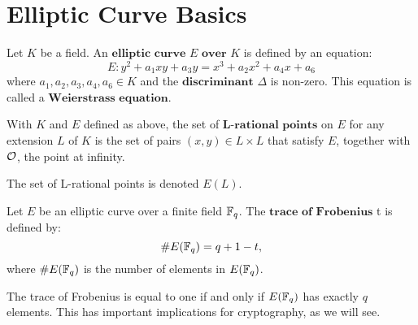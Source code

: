 \chapter{Elliptic Curve Basics}%
\label{sec:elliptic-curves}

\begin{defn}
Let $K$ be a field. An $\textbf{elliptic curve $E$ over $K$}$ is defined by an equation:
$$E : y^2 + a_1xy + a_3y = x^3 + a_2x^2 + a_4x + a_6$$
where $a_1, a_2, a_3, a_4, a_6 \in K$ and the $\textbf{discriminant}$ $\Delta$ is non-zero. This equation is called a $\textbf{Weierstrass equation}$.
\end{defn}

\begin{defn}
With $K$ and $E$ defined as above, the set of $\textbf{L-rational points}$ on $E$ for any extension $L$ of $K$ is the set of pairs $(x, y) \in L \times L$ that
satisfy $E$, together with $\mathcal{O}$, the point at infinity.

The set of L-rational points is denoted $E(L)$.
\end{defn}

\begin{defn}
Let $E$ be an elliptic curve over a finite field $\mathbb{F}_q$. The $\textbf{trace of Frobenius}$ t is defined by:
$$ \#E(\mathbb{F}_q) = q + 1 - t, $$
where $\#E(\mathbb{F}_q)$ is the number of elements in $E(\mathbb{F}_q)$.
\end{defn}

\begin{rmk}
The trace of Frobenius is equal to one if and only if $E(\mathbb{F}_q)$ has exactly $q$ elements. This has important implications
for cryptography, as we will see.
\end{rmk}
